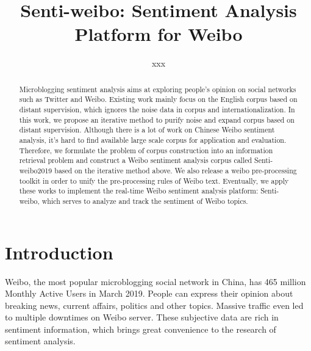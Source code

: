 \documentclass[runningheads]{llncs}
\begin{document}
%
\title{Senti-weibo: Sentiment Analysis Platform for Weibo}
%
\author{xxx}
%
%
%
\maketitle              %
%
\begin{abstract}
Microblogging sentiment analysis aims at exploring people's opinion on social networks such as Twitter and Weibo. Existing work mainly focus on the English corpus based on distant supervision, which ignores the noise data in corpus and internationalization. In this work, we propose an iterative method to purify noise and expand corpus based on distant supervision. Although there is a lot of work on Chinese Weibo sentiment analysis, it's hard to find available large scale corpus for application and evaluation. Therefore, we formulate the problem of corpus construction into an information retrieval problem and construct a Weibo sentiment analysis corpus called Senti-weibo2019 based on the iterative method above. We also release a weibo pre-processing toolkit in order to unify the pre-processing rules of Weibo text. Eventually, we apply these works to implement the real-time Weibo sentiment analysis platform: Senti-weibo, which serves to analyze and track the sentiment of Weibo topics.


\end{abstract}

\section{Introduction}
Weibo, the most popular microblogging social network in China, has 465 million Monthly Active Users in March 2019. People can express their opinion about breaking news, current affairs, politics and other topics. Massive traffic even led to multiple downtimes on Weibo server. These subjective data are rich in sentiment information, which brings great convenience to the research of sentiment analysis.
\end{document}
